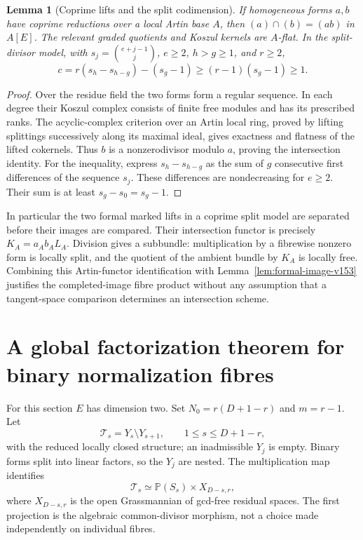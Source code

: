 \documentclass[11pt,reqno]{amsart}
\numberwithin{equation}{section}
\newtheorem{lemma}[theorem]{Lemma}
\theoremstyle{definition}\newtheorem{definition}[theorem]{Definition}
\theoremstyle{remark}\newtheorem{remark}[theorem]{Remark}
\newcommand{\Pj}{\mathbb P}\newcommand{\A}{\mathbb A}
\begin{document}
\begin{lemma}[Coprime lifts and the split codimension]
\label{lem:coprime-lifts-v153}
If homogeneous forms $a,b$ have coprime reductions over a local Artin
base $A$, then $(a)\cap(b)=(ab)$ in $A[E]$. The relevant graded
quotients and Koszul kernels are $A$-flat. In the split-divisor model,
with $s_j=\binom{e+j-1}{j}$, $e\geq2$, $h>g\geq1$, and $r\geq2$,
\[
 c=r(s_h-s_{h-g})-(s_g-1)\geq(r-1)(s_g-1)\geq1.
\]
\end{lemma}
\begin{proof}
Over the residue field the two forms form a regular sequence. In
each degree their Koszul complex consists of finite free modules and
has its prescribed ranks. The acyclic-complex criterion over an Artin
local ring, proved by lifting splittings successively along its maximal
ideal, gives exactness and flatness of the lifted cokernels. Thus $b$
is a nonzerodivisor modulo $a$, proving the intersection identity.
For the inequality, express $s_h-s_{h-g}$ as the sum of $g$ consecutive
first differences of the sequence $s_j$. These differences are
nondecreasing for $e\geq2$. Their sum is at least $s_g-s_0=s_g-1$.
\end{proof}

In particular the two formal marked lifts in a coprime split model
are separated before their images are compared. Their intersection
functor is precisely $K_A=a_A b_A L_A$. Division gives a subbundle:
multiplication by a fibrewise nonzero form is locally split, and the
quotient of the ambient bundle by $K_A$ is locally free. Combining
this Artin-functor identification with Lemma~\ref{lem:formal-image-v153}
justifies the completed-image fibre product without any assumption
that a tangent-space comparison determines an intersection scheme.


\section{A global factorization theorem for binary normalization fibres}
\label{sec:binary-fibres-v153}
For this section $E$ has dimension two. Set $N_0=r(D+1-r)$ and
$m=r-1$. Let
\[
 \mathcal T_s=Y_s\setminus Y_{s+1},\qquad 1\leq s\leq D+1-r,
\]
with the reduced locally closed structure; an inadmissible $Y_j$ is
empty. Binary forms split into linear factors, so the $Y_j$ are
nested. The multiplication map identifies
\[
 \mathcal T_s\simeq\Pj(S_s)\times X_{D-s,r},
\]
where $X_{D-s,r}$ is the open Grassmannian of gcd-free residual spaces.
The first projection is the algebraic common-divisor morphism, not a
choice made independently on individual fibres.
\end{document}

